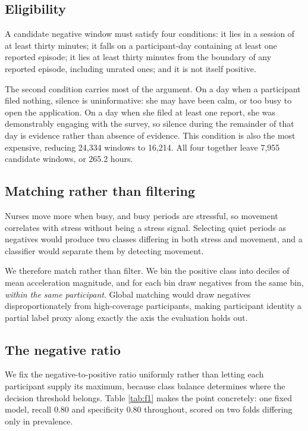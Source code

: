 \documentclass{article}
\begin{document}
\subsection{Eligibility}

A candidate negative window must satisfy four conditions: it lies in a session
of at least thirty minutes; it falls on a participant-day containing at least
one reported episode; it lies at least thirty minutes from the boundary of any
reported episode, including unrated ones; and it is not itself positive.

The second condition carries most of the argument. On a day when a participant
filed nothing, silence is uninformative: she may have been calm, or too busy to
open the application. On a day when she filed at least one report, she was
demonstrably engaging with the survey, so silence during the remainder of that
day is evidence rather than absence of evidence. This condition is also the
most expensive, reducing 24{,}334 windows to 16{,}214. All four together leave
7{,}955 candidate windows, or 265.2 hours.

\subsection{Matching rather than filtering}

Nurses move more when busy, and busy periods are stressful, so movement
correlates with stress without being a stress signal. Selecting quiet periods
as negatives would produce two classes differing in both stress and movement,
and a classifier would separate them by detecting movement.

We therefore match rather than filter. We bin the positive class into deciles
of mean acceleration magnitude, and for each bin draw negatives from the same
bin, \emph{within the same participant}. Global matching would draw negatives
disproportionately from high-coverage participants, making participant identity
a partial label proxy along exactly the axis the evaluation holds out.

\subsection{The negative ratio}

We fix the negative-to-positive ratio uniformly rather than letting each
participant supply its maximum, because class balance determines where the
decision threshold belongs. Table \ref{tab:f1} makes the point concretely: one
fixed model, recall $0.80$ and specificity $0.80$ throughout, scored on two
folds differing only in prevalence.
\end{document}
